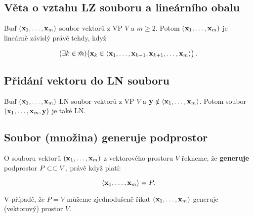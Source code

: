\subsection*{Věta o vztahu LZ souboru a lineárního obalu}

Buď $(\mathbf{x}_{1},\dots,\mathbf{x}_{m})$ soubor vektorů z VP $V$ a $m\geq 2$. Potom
$(\mathbf{x}_{1},\dots,\mathbf{x}_{m})$ je lineárně závislý právě tehdy, když

\[ (\exists k\in\hat{m})\big(\mathbf{x}_{k}\in\langle \mathbf{x}_{1},\dots,\mathbf{x}_{k-1},\mathbf{x}_{k+1},\dots,\mathbf{x}_{m} \rangle\big) \,. \]

\subsection*{Přidání vektoru do LN souboru}

Buď $(\mathbf{x}_{1},\dots,\mathbf{x}_{m})$ LN soubor vektorů z VP $V$ a $\mathbf{y}\notin\langle
      \mathbf{x}_{1},\dots,\mathbf{x}_{m} \rangle $. Potom soubor $(\mathbf{x}_{1},\dots,\mathbf{x}_{m},\mathbf{y})$ je
také LN.

\subsection*{Soubor (množina) generuje podprostor}

O souboru vektorů $(\mathbf{x}_1,\dots,\mathbf{x}_m)$ z vektorového prostoru $V$ řekneme, že
\textbf{generuje} podprostor $P\subset \subset V$, právě když platí:

\[ \langle \mathbf{x}_1,\dots,\mathbf{x}_m \rangle =P. \]

V případě, že $P=V$ můžeme zjednodušeně říkat $(\mathbf{x}_1,\dots,\mathbf{x}_m)$ generuje
(vektorový) prostor $V$.

